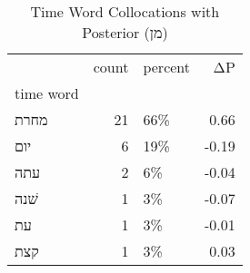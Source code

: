 \begin{table}[htbp!]
\centering
\caption{Time Word Collocations with Posterior (מן)}
\label{table:postמן_head_cpd}
\begin{tabular}{lrlr}
\toprule
{} &  count & percent &    ΔP \\
time word &        &         &       \\
\midrule
מחרת      &     21 &     66\% &  0.66 \\
יום       &      6 &     19\% & -0.19 \\
עתה       &      2 &      6\% & -0.04 \\
שׁנה      &      1 &      3\% & -0.07 \\
עת        &      1 &      3\% & -0.01 \\
קצת       &      1 &      3\% &  0.03 \\
\bottomrule
\end{tabular}
\end{table}
